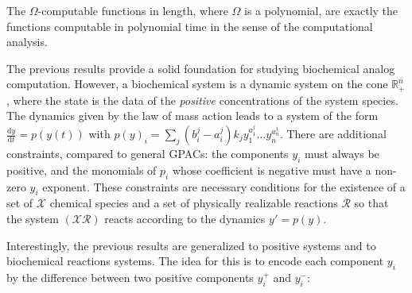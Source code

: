 \documentclass[graybox]{svmult}
\begin{document}

\begin{theorem} \cite{Pouly15}
The $ \Omega$-computable functions in length, where $ \Omega $ is a polynomial, are exactly the functions computable in polynomial time in the sense of the computational analysis.
\end{theorem}


The previous results provide a solid foundation for studying biochemical analog computation.
However, a biochemical system is a dynamic system on the cone $ \mathbb{R} _ + ^ n $, where the state is the data of the \emph{positive} concentrations of the system species.
The dynamics given by the law of mass action leads to a system of the form $\frac{\mathrm{d}y}{\mathrm{d}t} = p(y(t))$ with $p(y)_i = \sum_{j} (b^j_i - a^j_i) k_j y_1^{a^j_1} \ldots y_n^{a^j_n}$.
There are additional constraints, compared to general GPACs:
the components $ y_i $ must always be positive,
and the monomials of $ p_i $ whose coefficient is negative must have a non-zero $ y_i $ exponent.
These constraints are necessary conditions for the existence of a set of $ \mathcal{X} $ chemical species and a set of physically realizable reactions $ \mathcal{R} $ so that the system $ (\mathcal{X} \mathcal{R}) $ reacts according to the dynamics $ y '= p (y) $.

Interestingly, the previous results are generalized to positive systems and to biochemical reactions systems.
The idea for this is to encode each component $ y_i $ by the difference between two positive components $ y_i ^ + $ and $ y_i ^ - $:
\end{document}
